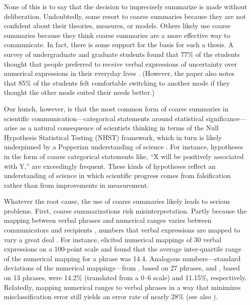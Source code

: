 \documentclass[12pt]{article}
\begin{document}
None of this is to say that the decision to imprecisely summarize is made without deliberation. Undoubtedly, some resort to coarse summaries because they are not confident about their theories, measures, or models. Others likely use coarse summaries because they think coarse summaries are a more effective way to communicate. In fact, there is some support for the basis for such a thesis. A survey of undergraduate and graduate students found that 77\% of the students thought that people preferred to receive verbal expressions of uncertainty over numerical expressions in their everyday lives \citep{wallsten1993preferences}. (However, the paper also notes that 85\% of the students felt comfortable switching to another mode if they thought the other mode suited their needs better.)  

Our hunch, however, is that the most common form of coarse summaries in scientific communication---categorical statements around statistical significance---arise as a natural consequence of scientists thinking in terms of the Null Hypothesis Statistical Testing (NHST) framework, which in turn is likely underpinned by a Popperian understanding of science \citep{gelman2013philosophy}. For instance, hypotheses in the form of coarse categorical statements like, ``X will be positively associated with Y,'' are exceedingly frequent. These kinds of hypotheses reflect an understanding of science in which  scientific progress comes from falsification rather than from improvements in measurement. 

Whatever the root cause, the use of coarse summaries likely leads to serious problems. First, coarse summarizations risk misinterpretation. Partly because the mapping between verbal phrases and numerical ranges varies between communicators and recipients \citep{capriotti2011miscommunication}, numbers that verbal expressions are mapped to vary a great deal \citep{beyth1982probable, bocklisch2010role, brun1988verbal, simpson1944specific, simpson1963stability}. For instance, \citet{beyth1982probable} elicited numerical mappings of 30 verbal expressions on a 100-point scale and found that the average inter-quartile range of the numerical mapping for a phrase was 14.4. Analogous numbers---standard deviations of the numerical mappings---from \citet{brun1988verbal}, based on 27 phrases, and \citet{bocklisch2010role}, based on 13 phrases, were 14.2\% (translated from a 0--6 scale) and 11.15\%, respectively. Relatedly, mapping numerical ranges to verbal phrases in a way that minimizes misclassification error still yields an error rate of nearly 28\% \citep{elsaesser2013much} (see also \citealt{bocklisch2010role}). 
\end{document}
